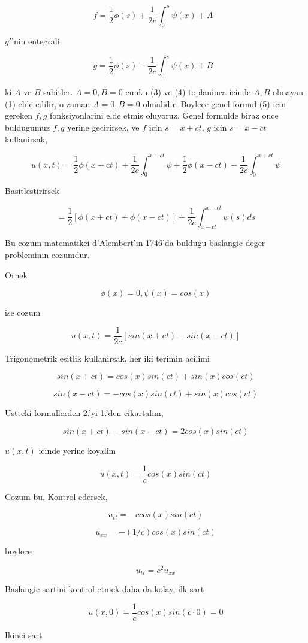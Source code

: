 \documentclass[12pt,fleqn]{article}
\begin{document}
\[ f = \frac{1}{2}\phi(s) + \frac{1}{2c} \int_0^s \psi(x) + A 
\ \ \ \label{3}
\]

$g'$'nin entegrali

\[ g = \frac{1}{2}\phi(s) - \frac{1}{2c} \int_0^s \psi(x) + B
\ \ \ \label{4}
\]


ki $A$ ve $B$ sabitler. $A=0,B=0$ cunku (3) ve (4) toplaninca icinde $A,B$
olmayan (1) elde edilir, o zaman $A=0,B=0$ olmalidir. Boylece genel formul
(5) icin gereken $f,g$ fonksiyonlarini elde etmis oluyoruz. Genel formulde
biraz once buldugumuz $f,g$ yerine gecirirsek, ve $f$ icin $s = x+ct$, $g$
icin $s = x-ct$ kullanirsak,

\[ u(x,t) = 
\frac{1}{2}\phi(x+ct) + 
\frac{1}{2c} \int_0 ^{x+ct} \psi + 
\frac{1}{2}\phi(x-ct) -
\frac{1}{2c} \int_0 ^{x+ct} \psi 
 \]

Basitlestirirsek 

\[ = \frac{1}{2}[\phi(x+ct) + \phi(x-ct)] + 
\frac{1}{2c} \int_{x-ct} ^{x+ct} \psi (s) ds
 \]

Bu cozum matematikci d'Alembert'in 1746'da buldugu baslangic deger
probleminin cozumdur. 

Ornek

\[ \phi(x) = 0, \psi(x) = cos(x) \] 

ise cozum 

\[ u(x,t) = \frac{1}{2c}[sin(x+ct) - sin(x-ct)] \]

Trigonometrik esitlik kullanirsak, her iki terimin acilimi

\[ sin(x+ct) = cos(x)sin(ct) + sin(x)cos(ct) \]

\[ sin(x-ct) = -cos(x)sin(ct) + sin(x)cos(ct) \]

Ustteki formullerden 2.'yi 1.'den cikartalim, 

\[ sin(x+ct) - sin(x-ct) = 2cos(x)sin(ct) \]

$u(x,t)$ icinde yerine koyalim

\[ u(x,t) = \frac{1}{c}cos(x)sin(ct) \]

Cozum bu. Kontrol edersek, 

\[ u_{tt} = -c cos(x)sin(ct) \]

\[ u_{xx} = -(1/c)cos(x)sin(ct) \]

boylece 

\[ u_{tt} = c^2 u_{xx} \]

Baslangic sartini kontrol etmek daha da kolay, ilk sart

\[ u(x,0) = \frac{1}{c}cos(x)sin(c \cdot 0)  = 0\]

Ikinci sart
\end{document}
